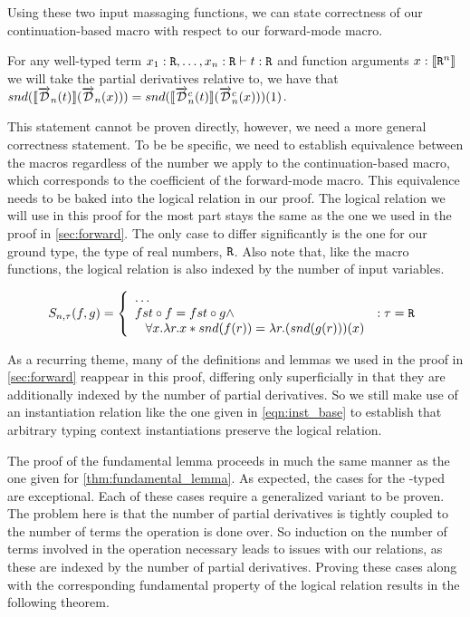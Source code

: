   Using these two input massaging functions, we can state correctness of our continuation-based macro with respect to our forward-mode macro.

  \begin{proposition}
    For any well-typed term $x_1 : \texttt{R}, \dots, x_n : \texttt{R} \vdash t : \texttt{R}$ and function arguments $x : \llbracket \texttt{R}^n \rrbracket$ we will take the partial derivatives relative to, we have that $snd(\llbracket\overrightarrow{\mathcal{D}}_n(t)\rrbracket (\overrightarrow{\mathcal{D}}_n(x))) = snd(\llbracket\overrightarrow{\mathcal{D}}^c_n(t)\rrbracket (\overrightarrow{\mathcal{D}}^c_n(x)))(1)$.
  \end{proposition}

  This statement cannot be proven directly, however, we need a more general correctness statement.
  To be be specific, we need to establish equivalence between the macros regardless of the number we apply to the continuation-based macro, which corresponds to the coefficient of the forward-mode macro.
  This equivalence needs to be baked into the logical relation in our proof.
  The logical relation we will use in this proof for the most part stays the same as the one we used in the proof in \cref{sec:forward}.
  The only case to differ significantly is the one for our ground type, the type of real numbers, $\texttt{R}$.
  Also note that, like the macro functions, the logical relation is also indexed by the number of input variables.

  \begin{equation}
    S_{n, \tau}(f, g) =
      \left\{
        \begin{array}{ll}
          \dots \\
          fst \circ f = fst \circ g \wedge
            & : \tau = \texttt{R} \\
          \;\;\;\forall x. \lambda r. x * snd(f(r)) = \lambda r. (snd(g(r)))(x)
        \end{array}
      \right.
  \label{eqn:lr_continuous}
  \end{equation}

  As a recurring theme, many of the definitions and lemmas we used in the proof in \cref{sec:forward} reappear in this proof, differing only superficially in that they are additionally indexed by the number of partial derivatives.
  So we still make use of an instantiation relation like the one given in \cref{eqn:inst_base} to establish that arbitrary typing context instantiations preserve the logical relation.

  The proof of the fundamental lemma proceeds in much the same manner as the one given for \cref{thm:fundamental_lemma}.
  As expected, the cases for the \synR-typed are exceptional.
  Each of these cases require a generalized variant to be proven.
  The problem here is that the number of partial derivatives is tightly coupled to the number of terms the operation is done over.
  So induction on the number of terms involved in the operation necessary leads to issues with our relations, as these are indexed by the number of partial derivatives.
  Proving these cases along with the corresponding fundamental property of the logical relation results in the following theorem.

